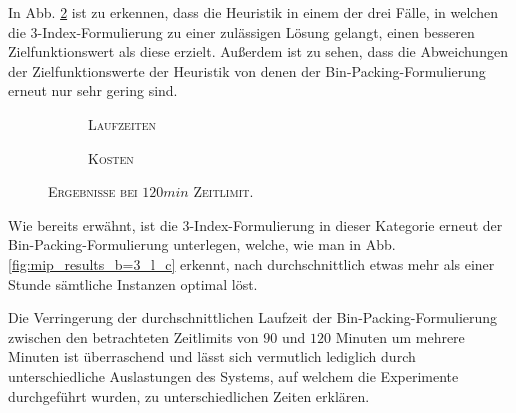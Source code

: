 In Abb. \ref{fig:b=3_l_costs} ist zu erkennen, dass die Heuristik in einem der drei Fälle, in welchen die
3-Index-Formulierung zu einer zulässigen Lösung gelangt, einen besseren Zielfunktionswert als diese erzielt.
Außerdem ist zu sehen, dass die Abweichungen der Zielfunktionswerte der Heuristik von denen der Bin-Packing-Formulierung
erneut nur sehr gering sind.

\begin{figure}[H]
\centering
\begin{subfigure}[b]{0.4\textwidth}
\centering
\caption{\textsc{Laufzeiten}}
\label{fig:b=3_l_runtimes}
\end{subfigure}
\hfill
\begin{subfigure}[b]{0.4\textwidth}
\centering
\caption{\textsc{Kosten}}
\label{fig:b=3_l_costs}
\end{subfigure}
\caption{\textsc{Ergebnisse bei $120min$ Zeitlimit}.}
\label{fig:res_plots_b=3_l}
\end{figure}

Wie bereits erwähnt, ist die 3-Index-Formulierung in dieser Kategorie erneut der Bin-Packing-Formulierung
unterlegen, welche, wie man in Abb. \ref{fig:mip_results_b=3_l_c} erkennt, nach durchschnittlich
etwas mehr als einer Stunde sämtliche Instanzen optimal löst.

Die Verringerung der durchschnittlichen Laufzeit der Bin-Packing-Formulierung zwischen den betrachteten
Zeitlimits von $90$ und $120$ Minuten um mehrere Minuten ist überraschend und lässt sich vermutlich
lediglich durch unterschiedliche Auslastungen des Systems, auf welchem die Experimente durchgeführt wurden,
zu unterschiedlichen Zeiten erklären.

